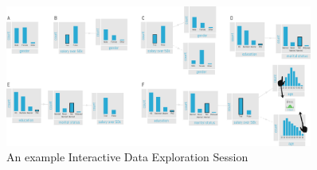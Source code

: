 \begin{figure}[ht]
\begin{center}
  \includegraphics[width=0.9\textwidth]{figures/storyboard}
\end{center}\vspace{-5.5ex}
\vspace{-2.5ex}
\caption{An example Interactive Data Exploration Session}
\vspace{-3.5ex}
\label{fig:sb}	
\end{figure}


